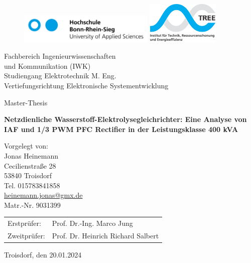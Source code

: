\begin{titlepage}
	\setlength{\parindent}{0pt}%
	\begin{figure}
		\includegraphics[height=1.4cm]{content/Grafiken/H-BRS_Logo}
		\hfill
		\includegraphics[height=2cm]{content/Grafiken/BRS}
	\end{figure}
	\vspace{1cm}
	\begin{onehalfspace}
		 Fachbereich Ingenieurwissenschaften\\
		 und Kommunikation (IWK)\\
		Studiengang Elektrotechnik M. Eng.\\
		Vertiefungsrichtung Elektronische Systementwicklung 
		\vspace{2cm}
		\begin{center}
			\begin{singlespacing}
				{\large\textsf{Master-Thesis}\par}
				\vspace{1mm}
				{\huge\textbf{\textsf{
					Netzdienliche Wasserstoff-Elektrolysegleichrichter: Eine Analyse von IAF und 1/3 PWM PFC Rectifier in der Leistungsklasse 400 kVA
				}}\par}
			\end{singlespacing}
		\end{center}
		\vfill
		Vorgelegt von:\\
		Jonas Heinemann\\
		Cecilienstraße 28\\
		53840 Troisdorf\\
		Tel. 015783841858\\
		\href{mailto:heinemann.jonas@gmx.de}{heinemann.jonas@gmx.de}\\
		Matr.-Nr. 9031399
		\begin{table}
			\begin{tabular}{@{}ll}
				Erstprüfer:  & Prof. Dr.-Ing. Marco Jung\\
				Zweitprüfer: & Prof. Dr. Heinrich Richard Salbert\\
			\end{tabular}
		\end{table}
	\end{onehalfspace}
	Troisdorf, den 20.01.2024
\end{titlepage}
